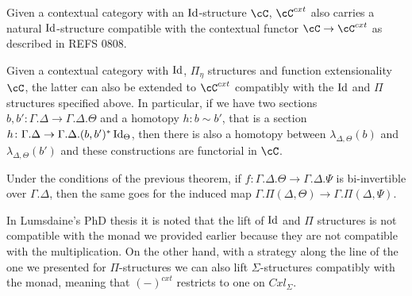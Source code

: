 \begin{prop}\cite[Prop.\ 3.3.1]{Gar09b}
  Given a contextual category with an $\operatorname{Id}$-structure $\cC$, $\cC^{cxt}$ also
  carries a natural $\operatorname{Id}$-structure compatible with the contextual functor
  $\cC\rightarrow\cC^{cxt}$ as described in REFS 0808.
\end{prop}

\begin{lem}\cite[Lemma 2.28]{1808}
  Given a contextual category with $\operatorname{Id}$, $\Pi_\eta$ structures and function
  extensionality $\cC$, the latter can also be extended to $\cC^{cxt}$
  compatibly with the $\operatorname{Id}$ and $\Pi$ structures specified above. In particular,
  if we have two sections
  $b,b'\colon\Gamma.\Delta\rightarrow\Gamma.\Delta.\Theta$ and a homotopy
  $h:b\sim b'$, that is a section
  $h\colon\Gamma.\Delta\rightarrow\Gamma.\Delta.(b,b')^*\operatorname{Id}_{\Theta}$,
  then there is also a homotopy between $\lambda_{\Delta,\Theta}(b)$ and
  $\lambda_{\Delta,\Theta}(b')$ and these constructions are functorial in $\cC$.
\end{lem}

\begin{cor}\cite[Lemma 2.29]{1808}
  Under the conditions of the previous theorem, if
  $f\colon\Gamma.\Delta.\Theta\rightarrow\Gamma.\Delta.\Psi$ is
  bi-invertible over $\Gamma.\Delta$, then the same goes for the induced map
  $\Gamma.\Pi(\Delta,\Theta)\rightarrow\Gamma.\Pi(\Delta,\Psi)$.
\end{cor}



\begin{rmk}
  In Lumsdaine's PhD thesis it is noted that the lift of $\operatorname{Id}$ and $\Pi$
  structures is not compatible with the monad we provided earlier because they
  are not compatible with the multiplication. On the other
  hand, with a strategy along the line of the one we presented for
  $\Pi$-structures we can also lift $\Sigma$-structures compatibly with the
  monad, meaning that $(-)^{cxt}$ restricts to one on $Cxl_\Sigma$.
\end{rmk}
